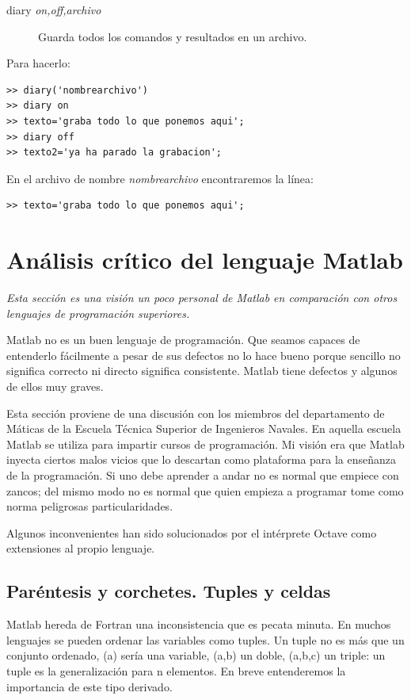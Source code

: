 \begin{description}
\item [{diary \textsl{on,off,archivo}}]Guarda todos los
  comandos y resultados en un archivo.
\end{description}
Para hacerlo:

\begin{lstlisting}
>> diary('nombrearchivo')
>> diary on
>> texto='graba todo lo que ponemos aqui';
>> diary off
>> texto2='ya ha parado la grabacion';
\end{lstlisting}

En el archivo de nombre \emph{nombrearchivo} encontraremos la línea:

\begin{lstlisting}
>> texto='graba todo lo que ponemos aqui';
\end{lstlisting}


\section{Análisis crítico del lenguaje Matlab}

\emph{Esta sección es una visión un poco personal de Matlab en
  comparación con otros lenguajes de programación superiores.}

Matlab no es un buen lenguaje de programación.  Que seamos capaces de
entenderlo fácilmente a pesar de sus defectos no lo hace bueno porque
sencillo no significa correcto ni directo significa consistente.
Matlab tiene defectos y algunos de ellos muy graves.

Esta sección proviene de una discusión con los miembros del
departamento de Máticas de la Escuela Técnica Superior de Ingenieros
Navales. En aquella escuela Matlab se utiliza para impartir cursos de
programación.  Mi visión era que Matlab inyecta ciertos malos vicios
que lo descartan como plataforma para la enseñanza de la
programación.  Si uno debe aprender a andar no es normal que empiece
con zancos; del mismo modo no es normal que quien empieza a
programar tome como norma peligrosas particularidades.

Algunos inconvenientes han sido solucionados por el intérprete Octave
como extensiones al propio lenguaje.

\subsection{Paréntesis y corchetes. Tuples y celdas}

Matlab hereda de Fortran una inconsistencia que es pecata minuta. En
muchos lenguajes se pueden ordenar las variables como tuples. Un tuple
no es más que un conjunto ordenado, (a) sería una variable, (a,b) un
doble, (a,b,c) un triple: un tuple es la generalización para n
elementos. En breve entenderemos la importancia de este tipo derivado.

